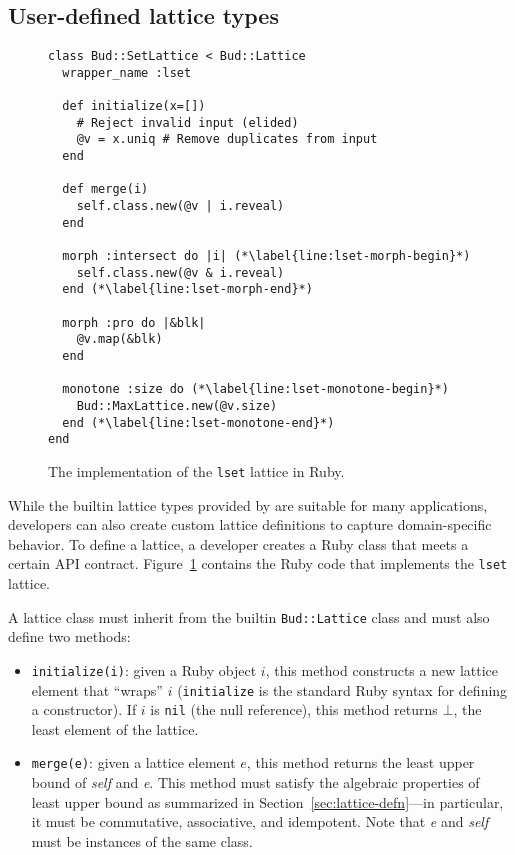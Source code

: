 \subsection{User-defined lattice types}
\begin{figure}[t]
\begin{scriptsize}
\begin{lstlisting}
class Bud::SetLattice < Bud::Lattice
  wrapper_name :lset

  def initialize(x=[])
    # Reject invalid input (elided)
    @v = x.uniq # Remove duplicates from input
  end

  def merge(i)
    self.class.new(@v | i.reveal)
  end

  morph :intersect do |i| (*\label{line:lset-morph-begin}*)
    self.class.new(@v & i.reveal)
  end (*\label{line:lset-morph-end}*)

  morph :pro do |&blk|
    @v.map(&blk)
  end

  monotone :size do (*\label{line:lset-monotone-begin}*)
    Bud::MaxLattice.new(@v.size)
  end (*\label{line:lset-monotone-end}*)
end
\end{lstlisting}
\end{scriptsize}
\caption{The implementation of the \texttt{lset} lattice in Ruby.}
\label{fig:lattice-lset}
\end{figure}

\label{sec:lattice-api}
While the builtin lattice types provided by \lang are suitable for many
applications, developers can also create custom lattice definitions to capture
domain-specific behavior. To define a lattice, a developer creates a Ruby class
that meets a certain API contract. Figure~\ref{fig:lattice-lset} contains the
Ruby code that implements the \texttt{lset} lattice.

A lattice class must inherit from the builtin \texttt{Bud::Lattice} class and
must also define two methods:

\begin{itemize}
\item \texttt{initialize(i)}: given a Ruby object $i$, this method constructs a
  new lattice element that ``wraps'' $i$ (\texttt{initialize} is the standard
  Ruby syntax for defining a constructor). If $i$ is \texttt{nil} (the null
  reference), this method returns $\bot$, the least element of the lattice.

\item \texttt{merge(e)}: given a lattice element $e$, this method returns the
  least upper bound of \emph{self} and \emph{e}. This method must satisfy the
  algebraic properties of least upper bound as summarized in
  Section~\ref{sec:lattice-defn}---in particular, it must be commutative,
  associative, and idempotent. Note that \emph{e} and \emph{self} must be
  instances of the same class.
\end{itemize}


